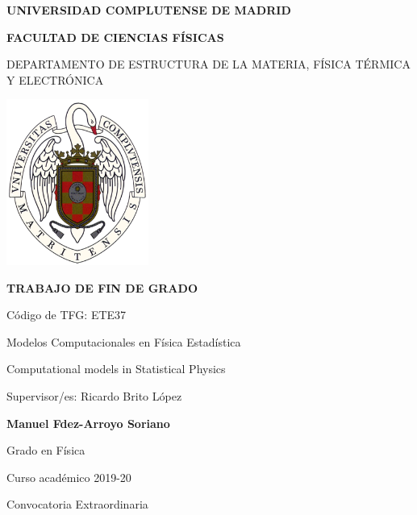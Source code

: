 \documentclass[11pt, a4paper]{article} %
\theoremstyle{named}
\begin{document}
\begin{titlepage}
\centering
{ \bfseries \Large UNIVERSIDAD COMPLUTENSE DE MADRID}
\vspace{0.5cm}

{\bfseries  \Large FACULTAD DE CIENCIAS FÍSICAS}
\vspace{1cm}

{\large DEPARTAMENTO DE ESTRUCTURA DE LA MATERIA, FÍSICA TÉRMICA Y ELECTRÓNICA}
\vspace{0.8cm}

{\includegraphics[width=0.35\textwidth]{logo_UCM}} %
\vspace{0.8cm}

{\bfseries \Large TRABAJO DE FIN DE GRADO}
\vspace{2cm}

{\Large Código de TFG:  ETE37 } \vspace{5mm}

{\Large Modelos Computacionales en Física Estadística}\vspace{5mm}

{\Large Computational models in Statistical Physics}\vspace{5mm}

{\Large Supervisor/es: Ricardo Brito López}\vspace{20mm}

{\bfseries \LARGE Manuel Fdez-Arroyo Soriano}\vspace{5mm}

{\large Grado en Física}\vspace{5mm}

{\large Curso acad\'emico 2019-20}\vspace{5mm}

{\large Convocatoria Extraordinaria}\vspace{5mm}

\end{titlepage}
\newpage
{} %
\clearpage
\end{document}

